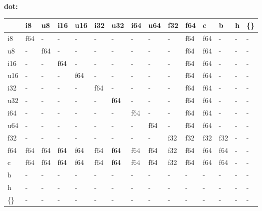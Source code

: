 \newpage
\textbf{dot:}
\begin{scriptsize}\begin{tt}\begin{center}\vspace{-.3cm}\begin{tabular}{|m{.65cm}||m{.65cm}|m{.65cm}|m{.65cm}|m{.65cm}|m{.65cm}|m{.65cm}|m{.65cm}|m{.65cm}|m{.65cm}|m{.65cm}|m{.65cm}|m{.65cm}|m{.65cm}|m{.65cm}|}\hline 
&i8&u8&i16&u16&i32&u32&i64&u64&f32&f64&c&b&h&\{\}\\ \hline \hline
i8&f64&-&-&-&-&-&-&-&-&f64&f64&-&-&-\\ \hline
u8&-&f64&-&-&-&-&-&-&-&f64&f64&-&-&-\\ \hline
i16&-&-&f64&-&-&-&-&-&-&f64&f64&-&-&-\\ \hline
u16&-&-&-&f64&-&-&-&-&-&f64&f64&-&-&-\\ \hline
i32&-&-&-&-&f64&-&-&-&-&f64&f64&-&-&-\\ \hline
u32&-&-&-&-&-&f64&-&-&-&f64&f64&-&-&-\\ \hline
i64&-&-&-&-&-&-&f64&-&-&f64&f64&-&-&-\\ \hline
u64&-&-&-&-&-&-&-&f64&-&f64&f64&-&-&-\\ \hline
f32&-&-&-&-&-&-&-&-&f32&f32&f32&f32&-&-\\ \hline
f64&f64&f64&f64&f64&f64&f64&f64&f64&f32&f64&f64&f64&-&-\\ \hline
c&f64&f64&f64&f64&f64&f64&f64&f64&f32&f64&f64&f64&-&-\\ \hline
b&-&-&-&-&-&-&-&-&-&-&-&-&-&-\\ \hline
h&-&-&-&-&-&-&-&-&-&-&-&-&-&-\\ \hline
\{\}&-&-&-&-&-&-&-&-&-&-&-&-&-&-\\ \hline
\end{tabular}\end{center}\end{tt}\end{scriptsize} 


